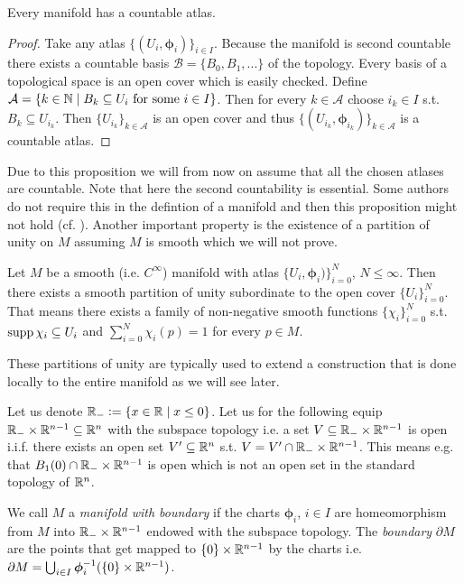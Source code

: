 \documentclass[../master_thesis.tex]{subfiles}
\begin{document}
\begin{proposition}
    Every manifold has a countable atlas. 
\end{proposition}
\begin{proof}
    Take any atlas $\{(U_i, \boldsymbol{\phi}_i) \}_{i \in I}$. Because the manifold is 
    second countable there exists a countable basis
    $\mathcal{B} = \{ B_0, B_1, ... \}$ of the topology. Every basis of a topological space is 
    an open cover which is easily checked. Define 
    $\mathcal{A} = \{ k \in \mathbb{N} \mid B_k \subseteq U_i \text{ for some 
    $i \in I$} \}$. Then for every $k \in \mathcal{A}$ choose 
    $i_k \in I$ s.t. $B_k \subseteq U_{i_k}$. Then $\{U_{i_k}\}_{k\in \mathcal{A}}$ 
    is an open cover and thus $\{ (U_{i_k}, \boldsymbol{\phi}_{i_k}) \}_{k \in \mathcal{A}}$
    is a countable atlas.
\end{proof}
Due to this proposition we will from now on assume that all the chosen atlases
are countable.
Note that here the second countability is essential. Some authors do not 
require this in the defintion of a manifold and then this proposition might not hold 
(cf. \cite[1.A.2]{gallot_hulin_lafontaine}).
Another important property is the existence of a partition of unity on $M$ 
assuming $M$ is smooth which we will not prove.

\begin{theorem}
    Let $M$ be a smooth (i.e. $C^\infty$) manifold with atlas 
    $\{U_i, \boldsymbol{\phi}_i)\}_{i=0}^N$, $N \leq \infty$. Then there exists a smooth
    partition of unity subordinate to the open cover $\{U_i\}_{i=0}^N$.
    That means there exists a family of non-negative smooth functions $\{ \chi_i \}_{i=0}^N$
    s.t. $\operatorname{supp} \chi_i \subseteq U_i$ and $\sum_{i=0}^N \chi_i(p) = 1$ 
    for every $p \in M$.
\end{theorem}
These partitions of unity are typically used to extend a construction that 
is done locally to the entire manifold as we will see later.

Let us denote $\mathbb{R}_- \vcentcolon= \{ x \in \mathbb{R} \mid x \leq 0 \}$. 
Let us for the following equip $\mathbb{R}_- \times \mathbb{R}^{n-1} \subseteq \mathbb{R}^n$ with the 
subspace topology i.e. a set $V \subseteq \mathbb{R}_- \times \mathbb{R}^{n-1}$ is
open i.i.f. there exists an open set $V' \subseteq \mathbb{R}^n$ s.t. 
$V = V' \cap \mathbb{R}_- \times \mathbb{R}^{n-1}$. This means e.g. that 
$B_1(0) \cap \mathbb{R}_- \times \mathbb{R}^{n-1}$ is open which is not an open set 
in the standard topology of $\mathbb{R}^n$.
\begin{definition}\label{def:manifold_with_boundary}
    We call $M$ a \textit{manifold with boundary} if the charts $\boldsymbol{\phi}_i$, 
    $i\in I$ are homeomorphism from $M$ into $\mathbb{R}_- \times \mathbb{R}^{n-1}$ 
    endowed with the subspace topology. The \textit{boundary} 
    $\partial M$ are the points that get mapped to $\{0\} \times \mathbb{R}^{n-1}$ 
    by the charts i.e. $\partial M = \bigcup_{i\in I} \boldsymbol{\phi}_i^{-1}(\{0\} \times \mathbb{R}^{n-1})$.
\end{definition}
\end{document}

